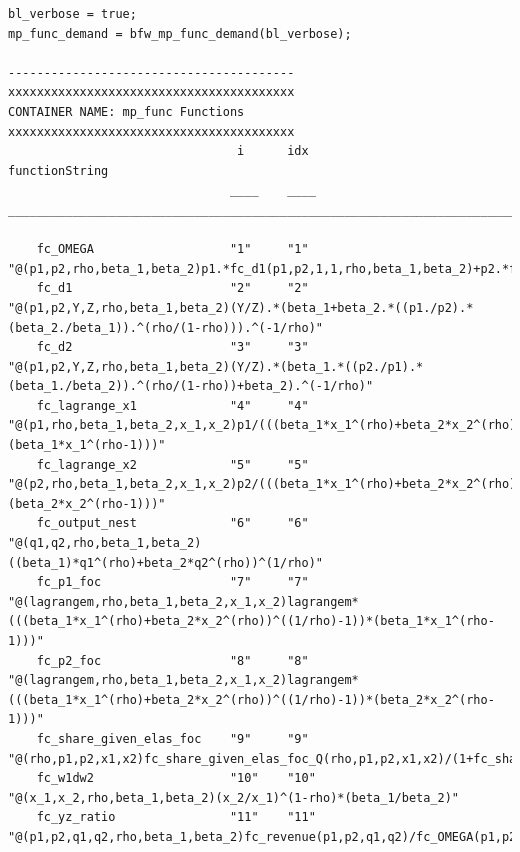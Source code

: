 \documentclass[
]{book}
\begin{document}
\begin{verbatim}
bl_verbose = true;
mp_func_demand = bfw_mp_func_demand(bl_verbose);

----------------------------------------
xxxxxxxxxxxxxxxxxxxxxxxxxxxxxxxxxxxxxxxx
CONTAINER NAME: mp_func Functions
xxxxxxxxxxxxxxxxxxxxxxxxxxxxxxxxxxxxxxxx
                                i      idx                                                           functionString                                                      
                               ____    ____    __________________________________________________________________________________________________________________________

    fc_OMEGA                   "1"     "1"     "@(p1,p2,rho,beta_1,beta_2)p1.*fc_d1(p1,p2,1,1,rho,beta_1,beta_2)+p2.*fc_d2(p1,p2,1,1,rho,beta_1,beta_2)"                 
    fc_d1                      "2"     "2"     "@(p1,p2,Y,Z,rho,beta_1,beta_2)(Y/Z).*(beta_1+beta_2.*((p1./p2).*(beta_2./beta_1)).^(rho/(1-rho))).^(-1/rho)"             
    fc_d2                      "3"     "3"     "@(p1,p2,Y,Z,rho,beta_1,beta_2)(Y/Z).*(beta_1.*((p2./p1).*(beta_1./beta_2)).^(rho/(1-rho))+beta_2).^(-1/rho)"             
    fc_lagrange_x1             "4"     "4"     "@(p1,rho,beta_1,beta_2,x_1,x_2)p1/(((beta_1*x_1^(rho)+beta_2*x_2^(rho))^((1/rho)-1))*(beta_1*x_1^(rho-1)))"              
    fc_lagrange_x2             "5"     "5"     "@(p2,rho,beta_1,beta_2,x_1,x_2)p2/(((beta_1*x_1^(rho)+beta_2*x_2^(rho))^((1/rho)-1))*(beta_2*x_2^(rho-1)))"              
    fc_output_nest             "6"     "6"     "@(q1,q2,rho,beta_1,beta_2)((beta_1)*q1^(rho)+beta_2*q2^(rho))^(1/rho)"                                                   
    fc_p1_foc                  "7"     "7"     "@(lagrangem,rho,beta_1,beta_2,x_1,x_2)lagrangem*(((beta_1*x_1^(rho)+beta_2*x_2^(rho))^((1/rho)-1))*(beta_1*x_1^(rho-1)))"
    fc_p2_foc                  "8"     "8"     "@(lagrangem,rho,beta_1,beta_2,x_1,x_2)lagrangem*(((beta_1*x_1^(rho)+beta_2*x_2^(rho))^((1/rho)-1))*(beta_2*x_2^(rho-1)))"
    fc_share_given_elas_foc    "9"     "9"     "@(rho,p1,p2,x1,x2)fc_share_given_elas_foc_Q(rho,p1,p2,x1,x2)/(1+fc_share_given_elas_foc_Q(rho,p1,p2,x1,x2))"             
    fc_w1dw2                   "10"    "10"    "@(x_1,x_2,rho,beta_1,beta_2)(x_2/x_1)^(1-rho)*(beta_1/beta_2)"                                                           
    fc_yz_ratio                "11"    "11"    "@(p1,p2,q1,q2,rho,beta_1,beta_2)fc_revenue(p1,p2,q1,q2)/fc_OMEGA(p1,p2,rho,beta_1,beta_2)"                               
\end{verbatim}
\end{document}
